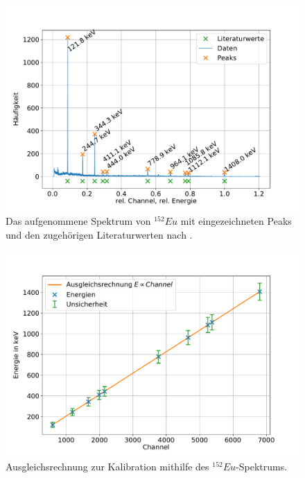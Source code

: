 \begin{figure}[h!]
  \centering
  \includegraphics[width=\textwidth]{content/images/spektrum_europium_kali.pdf}
  \caption{Das aufgenommene Spektrum von $^{152}Eu$ mit eingezeichneten Peaks und den zugehörigen Literaturwerten nach \cite{nucleide}.}
  \label{fig:eu_spect_kali}
\end{figure}

\begin{figure}[h!]
  \centering
  \includegraphics[width=\textwidth]{content/images/kalibration.pdf}
  \caption{Ausgleichsrechnung zur Kalibration mithilfe des $^{152}Eu$-Spektrums.}
  \label{fig:kali}
\end{figure}

\FloatBarrier
